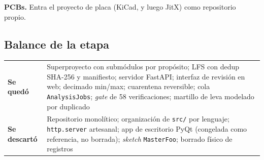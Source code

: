 
\textbf{PCBs.} Entra el proyecto de placa (KiCad, y luego JitX) como
repositorio propio.

\subsection{Balance de la etapa}

\begin{center}\small
\begin{tabularx}{\textwidth}{@{}l X@{}}
\toprule
\textbf{Se qued\'o} & Superproyecto con subm\'odulos por prop\'osito; LFS con dedup SHA-256 y manifiesto; servidor FastAPI; interfaz de revisi\'on en web; decimado min/max; cuarentena reversible; cola \texttt{AnalysisJobs}; \emph{gate} de 58 verificaciones; martillo de leva modelado por duplicado \\
\addlinespace[3pt]
\textbf{Se descart\'o} & Repositorio monol\'itico; organizaci\'on de \texttt{src/} por lenguaje; \texttt{http.server} artesanal; app de escritorio PyQt (congelada como referencia, no borrada); \emph{sketch} \texttt{MasterFoo}; borrado f\'isico de registros \\
\bottomrule
\end{tabularx}
\end{center}
